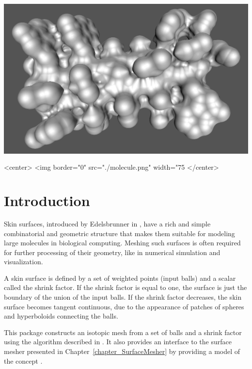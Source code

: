 \newcommand\ssWpoint[1]{{#1}_{(w)}}

\begin{ccTexOnly}
\begin{center}
\includegraphics[width=.9\textwidth]{Skin_surface_3/molecule}
\end{center}
\end{ccTexOnly}
\begin{ccHtmlOnly}
  <center>
  <img border="0" src="./molecule.png" width="75%
  </center>
\end{ccHtmlOnly}

\section{Introduction}
\label{sectionSkinSurfaceIntro}

Skin surfaces, introduced by Edelsbrunner in \cite{cgal:e-dssd-99},
have a rich and simple combinatorial and geometric structure that
makes them suitable for modeling large molecules in biological
computing.  Meshing such surfaces is often required for further
processing of their geometry, like in numerical simulation and
visualization.

A skin surface is defined by a set of weighted points (input balls)
and a scalar called the shrink factor. If the shrink factor is equal
to one, the surface is just the boundary of the union of the input
balls.  If the shrink factor decreases, the skin surface becomes
tangent continuous, due to the appearance of patches of spheres and
hyperboloids connecting the balls.

This package constructs an isotopic mesh from a set of balls and a
shrink factor using the algorithm described in
\cite{cgal:kv-mssct-05}. It also provides an interface to the surface
mesher presented in Chapter~\ref{chapter_SurfaceMesher} by providing a
model of the concept .

